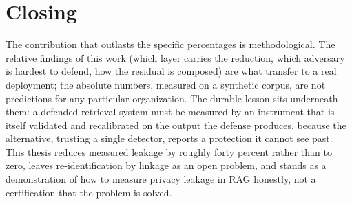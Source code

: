 \documentclass[12pt,a4paper]{report}
\begin{document}
\section{Closing}
\label{sec:concl-closing}

The contribution that outlasts the specific percentages is methodological. The relative findings
of this work (which layer carries the reduction, which adversary is hardest to defend, how the
residual is composed) are what transfer to a real deployment; the absolute numbers, measured on
a synthetic corpus, are not predictions for any particular organization. The durable lesson sits
underneath them: a defended retrieval system must be measured by an instrument that is itself
validated and recalibrated on the output the defense produces, because the alternative, trusting
a single detector, reports a protection it cannot see past. This thesis reduces measured leakage
by roughly forty percent rather than to zero, leaves re-identification by linkage as an open
problem, and stands as a demonstration of how to measure privacy leakage in RAG honestly, not
a certification that the problem is solved.





\nocite{*}


\end{document}
